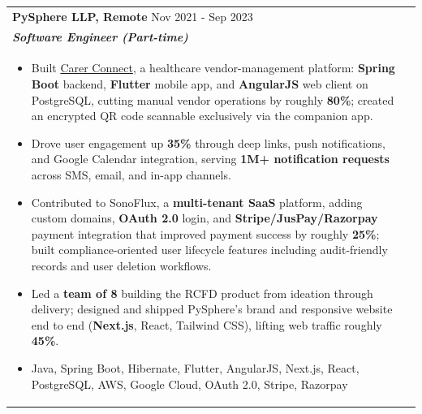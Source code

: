 \documentclass[a4paper,8pt]{article}
\begin{document}
\begin{tabularx}{\linewidth}{ @{}l r@{} }
\color[HTML]{1C033C} \textbf{PySphere LLP, Remote} \hfill \color[HTML]{371e77} Nov 2021 - Sep 2023 \\[4pt]
\color[HTML]{371e77}\textbf{\textit{Software Engineer (Part-time)}}\ \hfill \color[HTML]{4B28A4} \\[5pt]
\begin{minipage}[t]{\linewidth}
    \begin{itemize}[nosep,after=\strut, leftmargin=2em, itemsep=2pt]
        \item Built \href{https://carerconnect.co.uk/}{Carer Connect}, a healthcare vendor-management platform: \textbf{Spring Boot} backend, \textbf{Flutter} mobile app, and \textbf{AngularJS} web client on PostgreSQL, cutting manual vendor operations by roughly \textbf{80\%}; created an encrypted QR code scannable exclusively via the companion app.
        \item Drove user engagement up \textbf{35\%} through deep links, push notifications, and Google Calendar integration, serving \textbf{1M+ notification requests} across SMS, email, and in-app channels.
        \item Contributed to SonoFlux, a \textbf{multi-tenant SaaS} platform, adding custom domains, \textbf{OAuth 2.0} login, and \textbf{Stripe/JusPay/Razorpay} payment integration that improved payment success by roughly \textbf{25\%}; built compliance-oriented user lifecycle features including audit-friendly records and user deletion workflows.
        \item Led a \textbf{team of 8} building the RCFD product from ideation through delivery; designed and shipped PySphere's brand and responsive website end to end (\textbf{Next.js}, React, Tailwind CSS), lifting web traffic roughly \textbf{45\%}.
        \item Java, Spring Boot, Hibernate, Flutter, AngularJS, Next.js, React, PostgreSQL, AWS, Google Cloud, OAuth 2.0, Stripe, Razorpay
    \end{itemize}
\end{minipage}
\end{tabularx}
\end{document}
